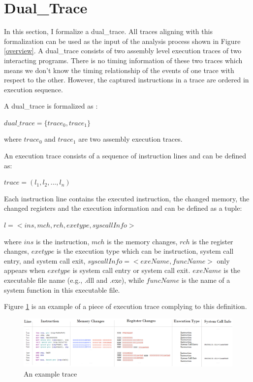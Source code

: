 \section{Dual\_Trace}\label{dualtrace}
In this section, I formalize a dual\_trace. All traces aligning with this formalization can be used as the input of the analysis process shown in Figure \ref{overview}. A dual\_trace consists of two assembly level execution traces of two interacting programs. There is no timing information of these two traces which means we don't know the timing relationship of the events of one trace with respect to the other. However, the captured instructions in a trace are ordered in execution sequence. 

A dual\_trace is formalized as :

$dual\_trace = \lbrace trace_0, trace_1\rbrace$

where $trace_0$ and $trace_1$ are two assembly execution traces.

An execution trace consists of a sequence of instruction lines and can be defined as: 

$ trace = (l_1, l_2, ..., l_n)$ 

Each instruction line contains the executed instruction, the changed memory, the changed registers and the execution information and can be defined as a tuple:

$l = <ins, mch, rch, exetype, syscallInfo>$

where $ins$ is the instruction, $mch$ is the memory changes, $rch$ is the register changes, $exetype$ is the execution type which can be instruction, system call entry, and system call exit, $syscallInfo = <exeName, funcName>$ only appears when $exetype$ is system call entry or system call exit. $exeName$ is the executable file name (e.g., .dll and .exe), while $funcName$ is the name of a system function in this executable file.

Figure \ref{tracedefined} is an example of a piece of execution trace complying to this definition. 

\begin{figure}[H]
\centerline{\includegraphics[scale=0.45]{Figures/tracedefined}}
\caption{An example trace }
\label{tracedefined}
\end{figure}



